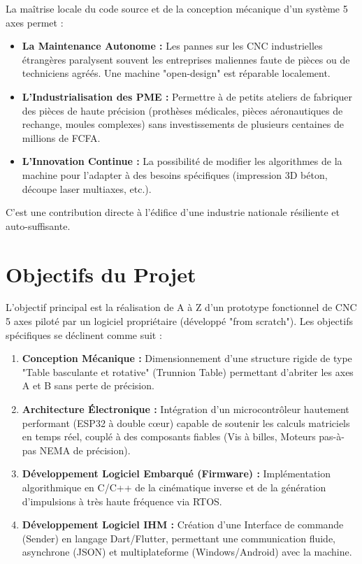 La maîtrise locale du code source et de la conception mécanique d'un système 5 axes permet :
\begin{itemize}
    \item \textbf{La Maintenance Autonome :} Les pannes sur les CNC industrielles étrangères paralysent souvent les entreprises maliennes faute de pièces ou de techniciens agréés. Une machine "open-design" est réparable localement.
    \item \textbf{L'Industrialisation des PME :} Permettre à de petits ateliers de fabriquer des pièces de haute précision (prothèses médicales, pièces aéronautiques de rechange, moules complexes) sans investissements de plusieurs centaines de millions de FCFA.
    \item \textbf{L'Innovation Continue :} La possibilité de modifier les algorithmes de la machine pour l'adapter à des besoins spécifiques (impression 3D béton, découpe laser multiaxes, etc.).
\end{itemize}
C’est une contribution directe à l'édifice d'une industrie nationale résiliente et auto-suffisante.

\section*{Objectifs du Projet}
L'objectif principal est la réalisation de A à Z d'un prototype fonctionnel de CNC 5 axes piloté par un logiciel propriétaire (développé "from scratch"). Les objectifs spécifiques se déclinent comme suit :
\begin{enumerate}
    \item \textbf{Conception Mécanique :} Dimensionnement d'une structure rigide de type "Table basculante et rotative" (Trunnion Table) permettant d'abriter les axes A et B sans perte de précision.
    \item \textbf{Architecture Électronique :} Intégration d'un microcontrôleur hautement performant (ESP32 à double cœur) capable de soutenir les calculs matriciels en temps réel, couplé à des composants fiables (Vis à billes, Moteurs pas-à-pas NEMA de précision).
    \item \textbf{Développement Logiciel Embarqué (Firmware) :} Implémentation algorithmique en C/C++ de la cinématique inverse et de la génération d'impulsions à très haute fréquence via RTOS.
    \item \textbf{Développement Logiciel IHM :} Création d'une Interface de commande (Sender) en langage Dart/Flutter, permettant une communication fluide, asynchrone (JSON) et multiplateforme (Windows/Android) avec la machine.
\end{enumerate}

